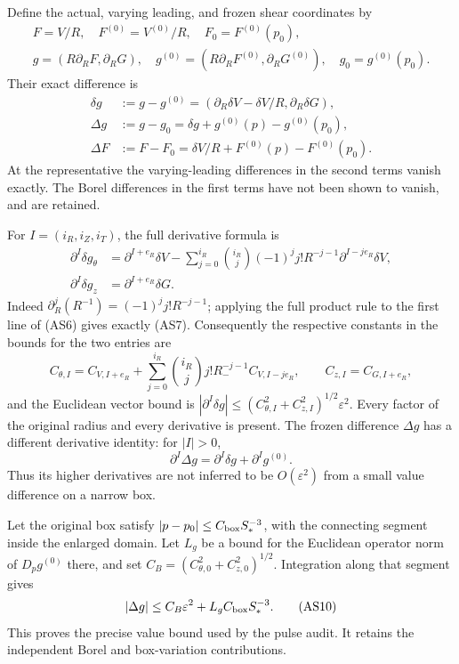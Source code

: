 \documentclass[10pt,a4paper]{article}
\begin{document}
Define the actual, varying leading, and frozen shear coordinates by \[
\begin{gathered}
F=V/R,\quad F^{(0)}=V^{(0)}/R,\quad F_0=F^{(0)}(p_0),\\
g=(R\partial_RF,\partial_RG),
\quad g^{(0)}=(R\partial_RF^{(0)},\partial_RG^{(0)}),
\quad g_0=g^{(0)}(p_0).
\end{gathered}
\tag{AS5}
\] Their exact difference is \[
\begin{aligned}
\delta g&:=g-g^{(0)}=(\partial_R\delta V-\delta V/R,\partial_R\delta G),\\
\Delta g&:=g-g_0=\delta g+g^{(0)}(p)-g^{(0)}(p_0),\\
\Delta F&:=F-F_0=\delta V/R+F^{(0)}(p)-F^{(0)}(p_0).
\end{aligned}
\tag{AS6}
\] At the representative the varying-leading differences in the second terms vanish exactly. The Borel differences in the first terms have not been shown to vanish, and are retained.

For \(I=(i_R,i_Z,i_T)\), the full derivative formula is \[
\begin{aligned}
\partial^I\delta g_\theta
&=\partial^{I+e_R}\delta V
-\sum_{j=0}^{i_R}\binom{i_R}{j}(-1)^j j!R^{-j-1}
\partial^{I-je_R}\delta V,\\
\partial^I\delta g_z&=\partial^{I+e_R}\delta G.
\end{aligned}
\tag{AS7}
\] Indeed \(\partial_R^j(R^{-1})=(-1)^jj!R^{-j-1}\); applying the full product rule to the first line of (AS6) gives exactly (AS7). Consequently the respective constants in the bounds for the two entries are \[
C_{\theta,I}=C_{V,I+e_R}
+\sum_{j=0}^{i_R}\binom{i_R}{j}j!R_-^{-j-1}C_{V,I-je_R},
\qquad C_{z,I}=C_{G,I+e_R},
\tag{AS8}
\] and the Euclidean vector bound is \(|\partial^I\delta g|\le(C_{\theta,I}^2+C_{z,I}^2)^{1/2}\varepsilon^2\). Every factor of the original radius and every derivative is present. The frozen difference \(\Delta g\) has a different derivative identity: for \(|I|>0\), \[
\partial^I\Delta g=\partial^I\delta g+\partial^Ig^{(0)}.
\tag{AS9}
\] Thus its higher derivatives are not inferred to be \(O(\varepsilon^2)\) from a small value difference on a narrow box.

Let the original box satisfy \(|p-p_0|\le C_{\rm box}S_*^{-3}\), with the connecting segment inside the enlarged domain. Let \(L_g\) be a bound for the Euclidean operator norm of \(D_pg^{(0)}\) there, and set \(C_B=(C_{\theta,0}^2+C_{z,0}^2)^{1/2}\). Integration along that segment gives \[
|\Delta g|\le C_B\varepsilon^2+L_gC_{\rm box}S_*^{-3}.
\tag{AS10}
\] This proves the precise value bound used by the pulse audit. It retains the independent Borel and box-variation contributions.
\end{document}
